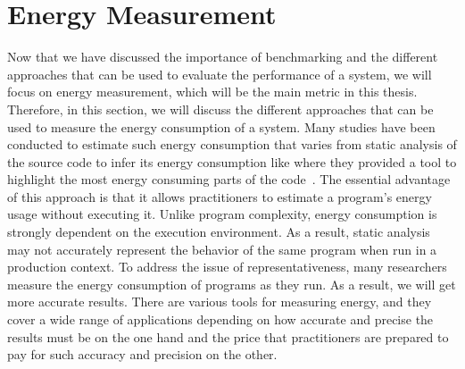 

\section{Energy Measurement}\label{sec:soa_energymeasurement}
Now that we have discussed the importance of benchmarking and the different approaches that can be used to evaluate the performance of a system, we will focus on energy measurement, which will be the main metric in this thesis.
Therefore, in this section, we will discuss the different approaches that can be used to measure the energy consumption of a system.
Many studies have been conducted to estimate such energy consumption that varies from static analysis of the source code to infer its energy consumption like \citeauthor{pereira_helping_2017} where they provided a tool to highlight the most energy consuming parts of the code~\cite{pereira_helping_2017}.
The essential advantage of this approach is that it allows practitioners to estimate a program's energy usage without executing it.
Unlike program complexity, energy consumption is strongly dependent on the execution environment.
As a result, static analysis may not accurately represent the behavior of the same program when run in a production context.
To address the issue of representativeness, many researchers measure the energy consumption of programs as they run. As a result, we will get more accurate results.
There are various tools for measuring energy, and they cover a wide range of applications depending on how accurate and precise the results must be on the one hand and the price that practitioners are prepared to pay for such accuracy and precision on the other.

